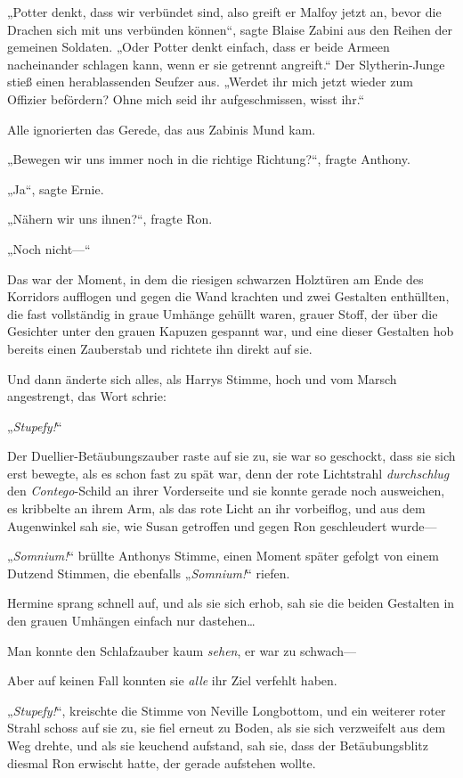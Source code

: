 {„Potter denkt, dass wir verbündet sind, also greift er Malfoy jetzt an, bevor die Drachen sich mit uns verbünden können“, sagte Blaise Zabini aus den Reihen der gemeinen Soldaten. „Oder Potter denkt einfach, dass er beide Armeen nacheinander schlagen kann, wenn er sie getrennt angreift.“ Der Slytherin-Junge stieß einen herablassenden Seufzer aus. „Werdet ihr mich jetzt wieder zum Offizier befördern? Ohne mich seid ihr aufgeschmissen, wisst ihr.“

Alle ignorierten das Gerede, das aus Zabinis Mund kam.

„Bewegen wir uns immer noch in die richtige Richtung?“, fragte Anthony.

„Ja“, sagte Ernie.

„Nähern wir uns ihnen?“, fragte Ron.

„Noch nicht—“

Das war der Moment, in dem die riesigen schwarzen Holztüren am Ende des Korridors aufflogen und gegen die Wand krachten und zwei Gestalten enthüllten, die fast vollständig in graue Umhänge gehüllt waren, grauer Stoff, der über die Gesichter unter den grauen Kapuzen gespannt war, und eine dieser Gestalten hob bereits einen Zauberstab und richtete ihn direkt auf sie.

Und dann änderte sich alles, als Harrys Stimme, hoch und vom Marsch angestrengt, das Wort schrie:

„\emph{Stupefy!}“

Der Duellier-Betäubungszauber raste auf sie zu, sie war so geschockt, dass sie sich erst bewegte, als es schon fast zu spät war, denn der rote Lichtstrahl \emph{durchschlug} den \emph{Contego}-Schild an ihrer Vorderseite und sie konnte gerade noch ausweichen, es kribbelte an ihrem Arm, als das rote Licht an ihr vorbeiflog, und aus dem Augenwinkel sah sie, wie Susan getroffen und gegen Ron geschleudert wurde—

„\emph{Somnium!}“ brüllte Anthonys Stimme, einen Moment später gefolgt von einem Dutzend Stimmen, die ebenfalls „\emph{Somnium!}“ riefen.

Hermine sprang schnell auf, und als sie sich erhob, sah sie die beiden Gestalten in den grauen Umhängen einfach nur dastehen…

Man konnte den Schlafzauber kaum \emph{sehen}, er war zu schwach—

Aber auf keinen Fall konnten sie \emph{alle} ihr Ziel verfehlt haben.

„\emph{Stupefy!}“, kreischte die Stimme von Neville Longbottom, und ein weiterer roter Strahl schoss auf sie zu, sie fiel erneut zu Boden, als sie sich verzweifelt aus dem Weg drehte, und als sie keuchend aufstand, sah sie, dass der Betäubungsblitz diesmal Ron erwischt hatte, der gerade aufstehen wollte.

}
